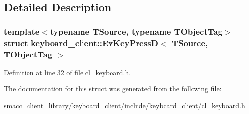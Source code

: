 \subsection{Detailed Description}
\subsubsection*{template$<$typename T\+Source, typename T\+Object\+Tag$>$\newline
struct keyboard\+\_\+client\+::\+Ev\+Key\+Press\+D$<$ T\+Source, T\+Object\+Tag $>$}



Definition at line 32 of file cl\+\_\+keyboard.\+h.



The documentation for this struct was generated from the following file\+:\begin{DoxyCompactItemize}
\item 
smacc\+\_\+client\+\_\+library/keyboard\+\_\+client/include/keyboard\+\_\+client/\hyperlink{cl__keyboard_8h}{cl\+\_\+keyboard.\+h}\end{DoxyCompactItemize}
